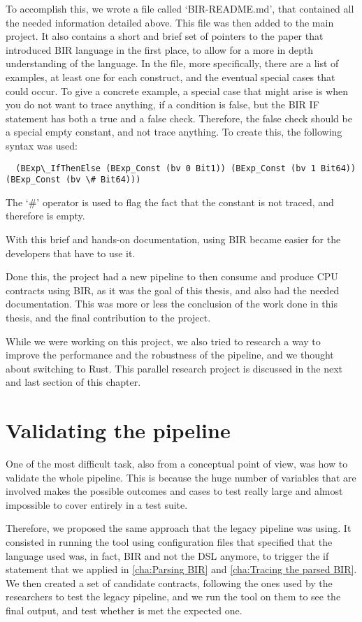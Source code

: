 To accomplish this, we wrote a file called `BIR-README.md', that contained all
the needed information detailed above. This file was then added to the main project.
It also contains a short and brief set of pointers to the paper that introduced
BIR language in the first place, to allow for a more in depth understanding of the
language. In the file, more specifically, there are a list of examples, at least
one for each construct, and the eventual special cases that could occur. To give
a concrete example, a special case that might arise is when you do not want to
trace anything, if a condition is false, but the BIR IF statement has both a
true and a false check. Therefore, the false check should be a special empty
constant, and not trace anything. To create this, the following syntax was used:
\begin{verbatim}
  (BExp\_IfThenElse (BExp_Const (bv 0 Bit1)) (BExp_Const (bv 1 Bit64)) (BExp_Const (bv \# Bit64)))
\end{verbatim}
The `\#' operator is used to flag the fact that the constant is not traced, and therefore
is empty.

With this brief and hands-on documentation, using BIR became easier for the
developers that have to use it.

Done this, the project had a new pipeline to then consume and produce CPU contracts
using BIR, as it was the goal of this thesis, and also had the needed documentation.
This was more or less the conclusion of the work done in this thesis, and the final
contribution to the project.

While we were working on this project, we also tried to research a way to
improve the performance and the robustness of the pipeline, and we thought about
switching to Rust. This parallel research project is discussed in the next and
last section of this chapter.

\chapter{Validating the pipeline}
\label{cha:Validating the pipeline} One of the most difficult task, also from a
conceptual point of view, was how to validate the whole pipeline. This is
because the huge number of variables that are involved makes the possible
outcomes and cases to test really large and almost impossible to cover entirely
in a test suite.

Therefore, we proposed the same approach that the legacy pipeline was using. It
consisted in running the tool using configuration files that specified that the
language used was, in fact, BIR and not the DSL anymore, to trigger the if statement
that we applied in \cref{cha:Parsing BIR} and \cref{cha:Tracing the parsed BIR}.
We then created a set of candidate contracts, following the ones used by the researchers
to test the legacy pipeline, and we run the tool on them to see the final output,
and test whether is met the expected one.

